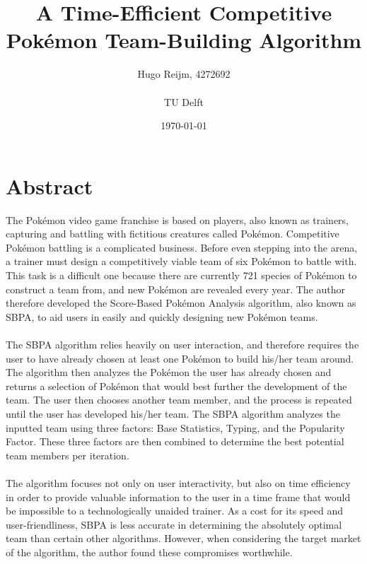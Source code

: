 \documentclass{article}
\title{A Time-Efficient Competitive Pok\'emon Team-Building Algorithm}
\author{Hugo Reijm, 4272692\\\\TU Delft}
\date{\today}
\begin{document}
\maketitle

\newpage
\section*{Abstract}
The Pok\'emon video game franchise is based on players, also known as trainers, capturing and battling with fictitious creatures called Pok\'emon. Competitive Pok\'emon battling is a complicated business. Before even stepping into the arena, a trainer must design a competitively viable team of six Pok\'emon to battle with. This task is a difficult one because there are currently 721 species of Pok\'emon to construct a team from, and new Pok\'emon are revealed every year. The author therefore developed the Score-Based Pok\'emon Analysis algorithm, also known as SBPA, to aid users in easily and quickly designing new Pok\'emon teams.\\\\
The SBPA algorithm relies heavily on user interaction, and therefore requires the user to have already chosen at least one Pok\'emon to build his/her team around. The algorithm then analyzes the Pok\'emon the user has already chosen and returns a selection of Pok\'emon that would best further the development of the team. The user then chooses another team member, and the process is repeated until the user has developed his/her team. The SBPA algorithm analyzes the inputted team using three factors: Base Statistics, Typing, and the Popularity Factor. These three factors are then combined to determine the best potential team members per iteration.\\\\
The algorithm focuses not only on user interactivity, but also on time efficiency in order to provide valuable information to the user in a time frame that would be impossible to a technologically unaided trainer. As a cost for its speed and user-friendliness, SBPA is less accurate in determining the absolutely optimal team than certain other algorithms. However, when considering the target market of the algorithm, the author found these compromises worthwhile.

\newpage
\tableofcontents

\newpage
\end{document}
